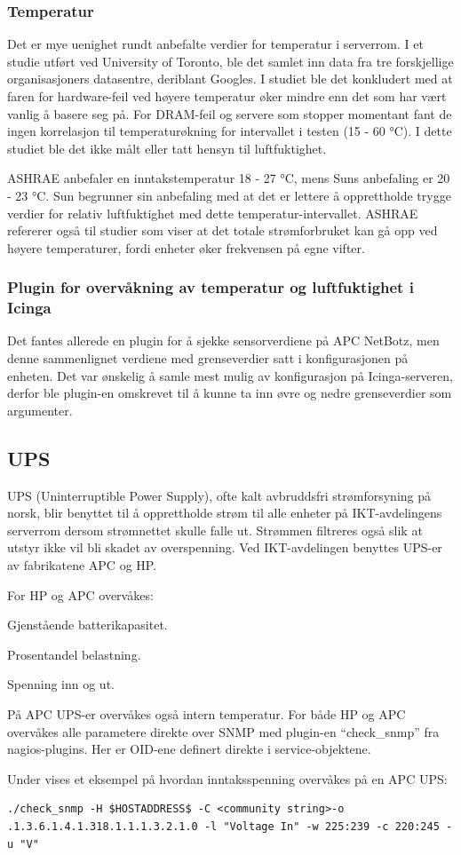 \subsubsection{Temperatur}
Det er mye uenighet rundt anbefalte verdier for temperatur i serverrom. I et studie utført ved University of Toronto\cite{torontopaper}, ble det samlet inn data fra tre forskjellige organisasjoners datasentre, deriblant Googles. I studiet ble det konkludert med at faren for hardware-feil ved høyere temperatur øker mindre enn det som har vært vanlig å basere seg på. For DRAM-feil og servere som stopper momentant fant de ingen korrelasjon til temperaturøkning for intervallet i testen (15 - 60 °C). I dette studiet ble det ikke målt eller tatt hensyn til luftfuktighet. 

ASHRAE anbefaler en inntakstemperatur 18 - 27 °C, mens Suns anbefaling er 20 - 23 °C. Sun begrunner sin anbefaling med at det er lettere å opprettholde trygge verdier for relativ luftfuktighet med dette temperatur-intervallet. ASHRAE refererer også til studier som viser at det totale strømforbruket kan gå opp ved høyere temperaturer, fordi enheter øker frekvensen på egne vifter\cite{datacentertemp}.

\subsubsection{Plugin for overvåkning av temperatur og luftfuktighet i Icinga}
Det fantes allerede en plugin for å sjekke sensorverdiene på APC NetBotz\cite{checknetbotz}, men denne sammenlignet verdiene med grenseverdier satt i konfigurasjonen på enheten. Det var ønskelig å samle mest mulig av konfigurasjon på Icinga-serveren, derfor ble plugin-en omskrevet til å kunne ta inn øvre og nedre grenseverdier som argumenter.

\subsection{UPS}
UPS (Uninterruptible Power Supply), ofte kalt avbruddsfri strømforsyning på norsk, blir benyttet til å opprettholde strøm til alle enheter på IKT-avdelingens serverrom dersom strømnettet skulle falle ut. Strømmen filtreres også slik at utstyr ikke vil bli skadet av overspenning. Ved IKT-avdelingen benyttes UPS-er av fabrikatene APC og HP.

For HP og APC overvåkes:
\begin{itemize*}
 	\item Gjenstående batterikapasitet.
	\item Prosentandel belastning.
	\item Spenning inn og ut.
\end{itemize*}
På APC UPS-er overvåkes også intern temperatur. For både HP og APC overvåkes alle parametere direkte over SNMP med plugin-en ``check\_snmp'' fra nagios-plugins. Her er OID-ene definert direkte i service-objektene.

Under vises et eksempel på hvordan inntaksspenning overvåkes på en APC UPS:
\begin{lstlisting}[style=example]
./check_snmp -H $HOSTADDRESS$ -C <community string>-o .1.3.6.1.4.1.318.1.1.1.3.2.1.0 -l "Voltage In" -w 225:239 -c 220:245 -u "V"
\end{lstlisting}
